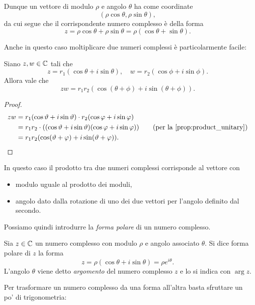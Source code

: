 Dunque un vettore di modulo $\rho$ e angolo $\theta$ ha come coordinate \[
    (\rho\cos\theta, \rho\sin\theta),
\] da cui segue che il corrispondente numero complesso è della forma \[
    z = \rho\cos\theta + \rho\sin\theta = \rho(\cos\theta + \sin\theta).
\]

Anche in questo caso moltiplicare due numeri complessi è particolarmente facile:
\begin{proposition} \label{prop:product_polar}
    Siano $z, w \in \mathbb{C}$ tali che \[
        z = r_1(\cos \theta + i\sin\theta), \quad w = r_2(\cos \phi + i\sin\phi).
    \]
    Allora vale che \begin{equation}
        zw = r_1r_2(\cos (\theta + \phi) + i\sin (\theta + \phi)).
    \end{equation}
\end{proposition}
\begin{proof}
    \begin{align*}
        zw &= r_1(\cos \theta + i\sin\theta) \cdot r_2(\cos \phi + i\sin\phi)\\
        &= r_1r_2 \cdot ((\cos \theta + i\sin\theta)(\cos \phi + i\sin\phi)) \tag{per la \autoref{prop:product_unitary}}\\
        &= r_1r_2(\cos (\theta + \phi) + i\sin (\theta + \phi)). \qedhere
    \end{align*}
\end{proof}

In questo caso il prodotto tra due numeri complessi corrisponde al vettore con \begin{itemize}
    \item modulo uguale al prodotto dei moduli,
    \item angolo dato dalla rotazione di uno dei due vettori per l'angolo definito dal secondo.
\end{itemize}

Possiamo quindi introdurre la \emph{forma polare} di un numero complesso.
\begin{definition}
    Sia $z \in \mathbb{C}$ un numero complesso con modulo $\rho$ e angolo associato $\theta$. Si dice forma polare di $z$ la forma \begin{equation}
        z = \rho(\cos\theta +i\sin\theta) = \rho e^{i\theta}.
    \end{equation}
    L'angolo $\theta$ viene detto \emph{argomento} del numero complesso $z$ e lo si indica con $\arg z$.
\end{definition}

Per trasformare un numero complesso da una forma all'altra basta sfruttare un po' di trigonometria:
